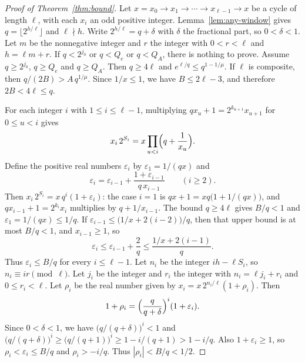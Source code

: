 \documentclass[11pt]{article}
\begin{document}
\begin{proof}[Proof of Theorem~\ref{thm:bound}]
Let $x = x_0 \to x_1 \to \cdots \to x_{\ell-1} \to x$ be a cycle of length $\ell$, with each $x_i$ an odd positive integer.
Lemma~\ref{lem:any-window} gives $q = \lfloor 2^{h/\ell} \rfloor$ and $\ell \nmid h$.
Write $2^{h/\ell} = q + \delta$ with $\delta$ the fractional part, so $0 < \delta < 1$.
Let $m$ be the nonnegative integer and $r$ the integer with $0 < r < \ell$ and $h = \ell m + r$.
If $q < 2^{j_0}$ or $q < Q_e$ or $q < Q_A$, there is nothing to prove.
Assume $q \ge 2^{j_0}$, $q \ge Q_e$ and $q \ge Q_A$.
Then $q \ge 4\ell$ and $e^{\ell/q} \le q^{1-1/\mu}$.
If $\ell$ is composite, then $q/(2B) > A\, q^{1/\mu}$.
Since $1/x \le 1$, we have $B \le 2\ell - 3$, and therefore $2B < 4\ell \le q$.

For each integer $i$ with $1 \le i \le \ell-1$, multiplying $q x_u + 1 = 2^{k_{u+1}} x_{u+1}$ for $0 \le u < i$ gives
\[
x_i\, 2^{S_i} = x \prod_{u < i}\Bigl(q + \frac{1}{x_u}\Bigr).
\]
Define the positive real numbers $\varepsilon_i$ by $\varepsilon_1 = 1/(qx)$ and
\[
\varepsilon_i = \varepsilon_{i-1} + \frac{1+\varepsilon_{i-1}}{q\, x_{i-1}}
\qquad (i \ge 2).
\]
Then $x_i\, 2^{S_i} = x\, q^i(1+\varepsilon_i)$: the case $i = 1$ is $qx + 1 = xq\bigl(1 + 1/(qx)\bigr)$, and $q x_{i-1} + 1 = 2^{k_i} x_i$ multiplies by $q + 1/x_{i-1}$.
The bound $q \ge 4\ell$ gives $B/q < 1$ and $\varepsilon_1 = 1/(qx) \le 1/q$.
If $\varepsilon_{i-1} \le \bigl(1/x + 2(i-2)\bigr)/q$, then that upper bound is at most $B/q < 1$, and $x_{i-1} \ge 1$, so
\[
\varepsilon_i \le \varepsilon_{i-1} + \frac{2}{q} \le \frac{1/x + 2(i-1)}{q}.
\]
Thus $\varepsilon_i \le B/q$ for every $i \le \ell-1$.
Let $n_i$ be the integer $ih - \ell S_i$, so $n_i \equiv ir \pmod{\ell}$.
Let $j_i$ be the integer and $r_i$ the integer with $n_i = \ell j_i + r_i$ and $0 \le r_i < \ell$.
Let $\rho_i$ be the real number given by $x_i = x\, 2^{n_i/\ell}(1+\rho_i)$.
Then
\[
1+\rho_i = \Bigl(\frac{q}{q+\delta}\Bigr)^i (1+\varepsilon_i).
\]
Since $0 < \delta < 1$, we have $\bigl(q/(q+\delta)\bigr)^i < 1$ and $\bigl(q/(q+\delta)\bigr)^i \ge \bigl(q/(q+1)\bigr)^i \ge 1 - i/(q+1) > 1 - i/q$.
Also $1+\varepsilon_i \ge 1$, so $\rho_i < \varepsilon_i \le B/q$ and $\rho_i > -i/q$.
Thus $|\rho_i| < B/q < 1/2$.


\end{proof}
\end{document}
